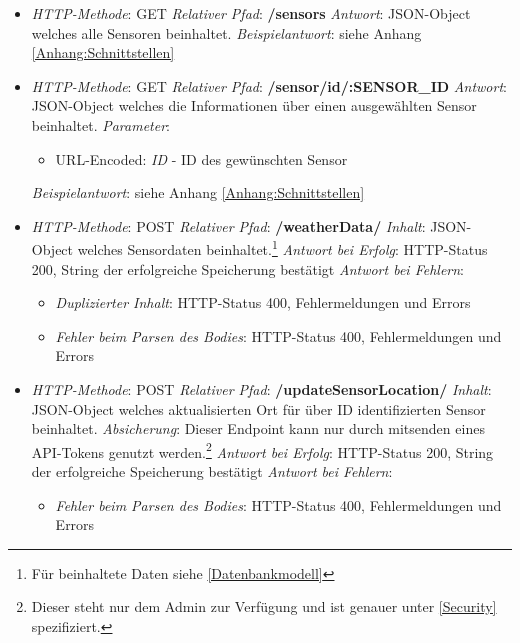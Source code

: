 \begin{itemize}
    \item \textsl{HTTP-Methode}: GET
    \subitem \textsl{Relativer Pfad}: \textbf{/sensors}
    \subitem \textsl{Antwort}: JSON-Object welches alle Sensoren beinhaltet.
    \subitem \textsl{Beispielantwort}: siehe Anhang \ref{Anhang:Schnittstellen}
\end{itemize}

\begin{itemize}
    \item \textsl{HTTP-Methode}: GET
    \subitem \textsl{Relativer Pfad}: \textbf{/sensor/id/:SENSOR\_ID}
    \subitem \textsl{Antwort}: JSON-Object welches die Informationen über einen ausgewählten Sensor beinhaltet.
    \subitem \textsl{Parameter}: \begin{itemize}
                                     \item URL-Encoded: \textit{ID} - ID des gewünschten Sensor
    \end{itemize}
    \subitem \textsl{Beispielantwort}: siehe Anhang \ref{Anhang:Schnittstellen}
\end{itemize}

\begin{itemize}
    \item \textsl{HTTP-Methode}: POST
    \subitem \textsl{Relativer Pfad}: \textbf{/weatherData/}
    \subitem \textsl{Inhalt}: JSON-Object welches Sensordaten beinhaltet.\footnote{Für beinhaltete Daten siehe \cref{Datenbankmodell}}%
    \subitem \textsl{Antwort bei Erfolg}: HTTP-Status 200, String der erfolgreiche Speicherung bestätigt
    \subitem \textsl{Antwort bei Fehlern}:\begin{itemize}
                                              \item \textit{Duplizierter Inhalt}: HTTP-Status 400, Fehlermeldungen und Errors
                                              \item \textit{Fehler beim Parsen des Bodies}: HTTP-Status 400, Fehlermeldungen und Errors
    \end{itemize}
\end{itemize}

\begin{itemize}
    \item \textsl{HTTP-Methode}: POST
    \subitem \textsl{Relativer Pfad}: \textbf{/updateSensorLocation/}
    \subitem \textsl{Inhalt}: JSON-Object welches aktualisierten Ort für über ID identifizierten Sensor beinhaltet.
    \subitem \textsl{Absicherung}: Dieser Endpoint kann nur durch mitsenden eines API-Tokens genutzt werden.\footnote{Dieser steht nur dem Admin zur Verfügung und ist genauer unter \cref{Security} spezifiziert.}
    \subitem \textsl{Antwort bei Erfolg}: HTTP-Status 200, String der erfolgreiche Speicherung bestätigt
    \subitem \textsl{Antwort bei Fehlern}:\begin{itemize}
                                              \item \textit{Fehler beim Parsen des Bodies}: HTTP-Status 400, Fehlermeldungen und Errors
    \end{itemize}
\end{itemize}


